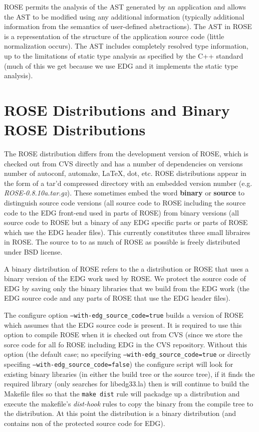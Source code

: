    ROSE permits the analysis of the AST generated by an application and allows the AST to
be modified using any additional information (typically additional information from the
semantics of user-defined abstractions). The AST in ROSE is a representation of the 
structure of the application source code (little normalization occurs). The AST includes
completely resolved type information, up to the limitations of static type analysis as
specified by the C++ standard (much of this we get because we use EDG and it implements
the static type analysis).


\section{ROSE Distributions and Binary ROSE Distributions}

   The ROSE distribution differs from the development version of ROSE, which
is checked out from CVS directly and has a number of dependencies on versions
number of autoconf, automake, LaTeX, dot, etc.  ROSE distributions appear in
the form of a tar'd compressed directory with an embedded version number 
(e.g. {\it ROSE-0.8.10a.tar.gz}). These sometimes embed the word {\bf binary} or {\bf source}
to distinguish source code versions (all source code to ROSE including the source code 
to the EDG front-end used in parts of ROSE) from binary versions (all source code to ROSE
but a binary of any EDG specific parts or parts of ROSE which use the EDG header files).
This currently constitutes three small libraires in ROSE.  The source to to as much of
ROSE as possible is freely distributed under BSD license.

   A binary distribution of ROSE refers to the a distribution or ROSE that uses a binary
version of the EDG work used by ROSE.  We protect the source code of EDG by saving only 
the binary libraries that we build from the EDG work (the EDG source code and any parts 
of ROSE that use the EDG header files).  

The configure option {\tt --with-edg_source_code=true} builds a version of ROSE which assumes
that the EDG source code is present. It is required to use this option to compile ROSE 
when it is checked out from CVS (since we store the sorce code for all fo ROSE including
EDG in the CVS repository.  Without this option (the default case; no specifying 
{\tt --with-edg_source_code=true} or directly specifing {\tt --with-edg_source_code=false}) the 
configure script will look for existing binary libraries (in either the build tree or the
source tree), if it finds the required library (only searches for libedg33.la) then
is will continue to build the Makefile files so that the {\tt make dist} rule will packadge up
a distribution and execute the makefile's {\it dist-hook} rules to copy the binary from the 
compile tree to the distribution.  At this point the distribution is a binary distribution
(and contains non of the protected source code for EDG).

